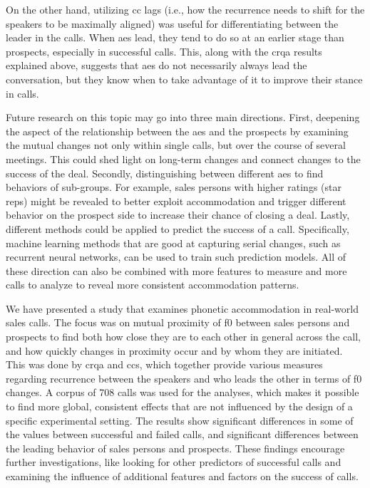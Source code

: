 On the other hand, utilizing \acl{cc} lags (i.e., how the recurrence needs to shift for the speakers to be maximally aligned) was useful for differentiating between the leader in the calls.
When \acp{ae} lead, they tend to do so at an earlier stage than prospects, especially in successful calls.
This, along with the \ac{crqa} results explained above, suggests that \acp{ae} do not necessarily always lead the conversation, but they know when to take advantage of it to improve their stance in calls.

Future research on this topic may go into three main directions.
First, deepening the aspect of the relationship between the \acp{ae} and the prospects by examining the mutual changes not only within single calls, but over the course of several meetings.
This could shed light on long-term changes and connect changes to the success of the deal.
Secondly, distinguishing between different \acp{ae} to find behaviors of sub-groups.
For example, sales persons with higher ratings (star reps) might be revealed to better exploit accommodation and trigger different behavior on the prospect side to increase their chance of closing a deal.
Lastly, different methods could be applied to predict the success of a call.
Specifically, machine learning methods that are good at capturing serial changes, such as recurrent neural networks, can be used to train such prediction models.
All of these direction can also be combined with more features to measure and more calls to analyze to reveal more consistent accommodation patterns.


We have presented a study that examines phonetic accommodation in real-world sales calls.
The focus was on mutual proximity of \acl{f0} between sales persons and prospects to find both how close they are to each other in general across the call, and how quickly changes in proximity occur and by whom they are initiated.
This was done by \acf{crqa} and \aclp{cc}, which together provide various measures regarding recurrence between the speakers and who leads the other in terms of \acl{f0} changes.
A corpus of 708 calls was used for the analyses, which makes it possible to find more global, consistent effects that are not influenced by the design of a specific experimental setting.
The results show significant differences in some of the values between successful and failed calls, and significant differences between the leading behavior of sales persons and prospects.
These findings encourage further investigations, like looking for other predictors of successful calls and examining the influence of additional features and factors on the success of calls.


